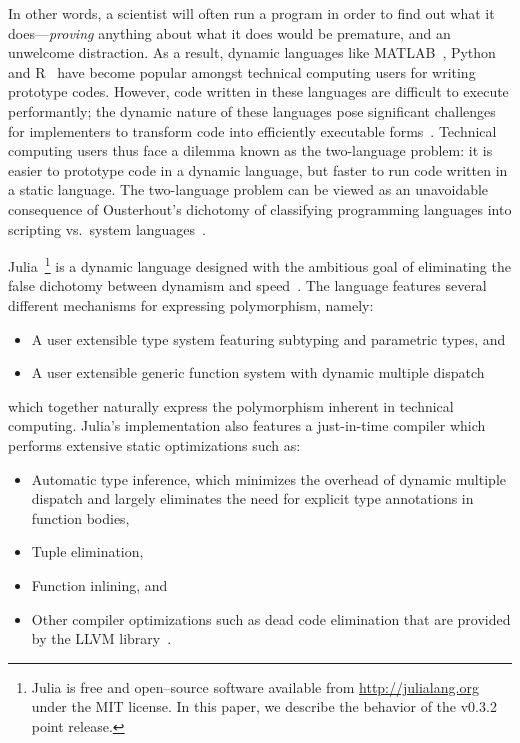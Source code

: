 \documentclass[pldi]{sigplanconf-pldi15}
\begin{document}
In other words, a scientist will often run a program in order to find out what
it does---\emph{proving} anything about what it does would be premature, and an
unwelcome distraction. As a result, dynamic languages like
MATLAB~\cite{matlab}, Python~\cite{pythonlib,pythonref} and R~\cite{rlang} have
become popular amongst technical computing users for writing prototype codes.
However, code written in these languages are difficult to execute performantly;
the dynamic nature of these languages pose significant challenges for
implementers to transform code into efficiently executable
forms~\cite{Joisha2001,Joisha2006,Seljebotn2009}. Technical computing users
thus face a dilemma known as the two-language problem: it is easier to
prototype code in a dynamic language, but faster to run code written in a
static language. The two-language problem can be viewed as an unavoidable
consequence of Ousterhout's dichotomy of classifying programming languages into
scripting vs.\ system languages~\cite{Ousterhout1998,Hoare2014}. 

Julia~\footnote{Julia is free and open--source software available from
\url{http://julialang.org} under the MIT license. In this paper, we describe
the behavior of the v0.3.2 point release.} is a dynamic language designed with
the ambitious goal of eliminating the false dichotomy between dynamism and
speed~\cite{Bezanson2012,Bezanson2014b}. The language features several
different mechanisms for expressing polymorphism, namely:

\begin{itemize}
	\item A user extensible type system featuring subtyping and parametric
		types, and
	\item A user extensible generic function system with dynamic multiple
		dispatch
\end{itemize}
%
which together naturally express the polymorphism inherent in technical
computing. Julia's implementation also features a just-in-time compiler which
performs extensive static optimizations such as:

\begin{itemize}
	\item Automatic type inference, which minimizes the overhead of dynamic
		multiple dispatch and largely eliminates the need for explicit
		type annotations in function bodies,

	\item Tuple elimination,
	\item Function inlining, and
	\item Other compiler optimizations such as dead code elimination that
		are provided by the LLVM library~\cite{Lattner2004}.
\end{itemize}
\end{document}
